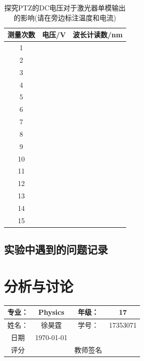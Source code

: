 \documentclass[10pt,a4paper]{ctexart}
\begin{document}
\begin{table}[H]
\begin{center}
    \caption{探究PTZ的DC电压对于激光器单模输出的影响(请在旁边标注温度和电流)}
    \begin{tabular}{|c|l|l|}
\hline
测量次数 & 电压/V & 波长计读数/nm \\ \hline
1    &       &          \\ \hline
2    &       &          \\ \hline
3    &       &          \\ \hline
4    &       &          \\ \hline
5    &       &          \\ \hline
6    &       &          \\ \hline
7    &       &          \\ \hline
8    &       &          \\ \hline
9    &       &          \\ \hline
10   &       &          \\ \hline
11   &       &          \\ \hline
12   &       &          \\ \hline
13   &       &          \\ \hline
14   &       &          \\ \hline
15   &       &          \\ \hline
\end{tabular}
\end{center}
\end{table}
\subsection{实验中遇到的问题记录}



\newpage
\section{分析与讨论}
\begin{center}
\begin{tabular}{|c|c|c|c|}
	\hline 
	专业：     &Physics       &年级：      & 17     \\
	\hline
	姓名：& 徐昊霆 &学号：&17353071  \\
	\hline
	日期&  \today              & &  \\
	\hline	
	评分 & & 教师签名 & \\
	\hline
\end{tabular}
\end{center}



%
%
\end{document}
